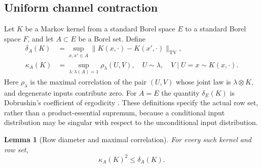 \documentclass[11pt]{amsart}
\numberwithin{equation}{section}
\newtheorem{lemma}[theorem]{Lemma}
\theoremstyle{definition}
\newcommand{\TV}{\mathrm{TV}}
\begin{document}
\subsection{Uniform channel contraction}
Let $K$ be a Markov kernel from a standard Borel space $E$ to a standard Borel space $F$, and let $A\subset E$ be a Borel set. Define
\begin{align}
\delta_A(K)&=\sup_{x,x'\in A}\|K(x,\cdot)-K(x',\cdot)\|_{\TV},\label{eq:diameter}\\
\kappa_A(K)&=\sup_{\lambda:\lambda(A)=1}\rho_\lambda(U,V),
\quad U\sim\lambda,\quad V\mid U=x\sim K(x,\cdot).\label{eq:robust}
\end{align}
Here $\rho_\lambda$ is the maximal correlation of the pair $(U,V)$ whose joint law is $\lambda\otimes K$, and degenerate inputs contribute zero. For $A=E$ the quantity $\delta_E(K)$ is Dobrushin's coefficient of ergodicity \cite{Dobrushin1956}. These definitions specify the actual row set, rather than a product-essential supremum, because a conditional input distribution may be singular with respect to the unconditional input distribution.

\begin{lemma}[Row diameter and maximal correlation]\label{lem:channel}
For every such kernel and row set,
\begin{equation}\label{eq:channel}
\kappa_A(K)^2\le\delta_A(K).
\end{equation}
\end{lemma}
\end{document}
